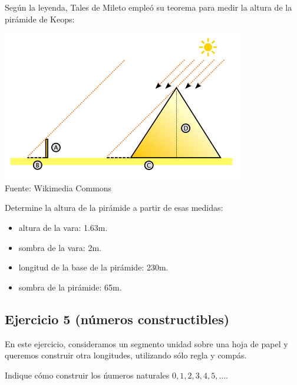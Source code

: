 Según la leyenda, Tales de Mileto empleó su teorema para medir la altura de la
pirámide de Keops:

\begin{center}
\includegraphics{cheops.png}\\
Fuente: Wikimedia Commons
\end{center}

Determine la altura de la pirámide a partir de esas medidas:

\begin{itemize}
  \item altura de la vara: 1.63m.
  \item sombra de la vara: 2m.
  \item longitud de la base de la pirámide: 230m.
  \item sombra de la pirámide: 65m.
\end{itemize}

\subsection{Ejercicio 5 (números constructibles)}

En este ejercicio, consideramos un segmento unidad sobre una hoja de papel y
queremos construir otra longitudes, utilizando sólo regla y compás.

\begin{center}
\end{center}

Indique cómo construir los ńumeros naturales $0, 1, 2, 3, 4, 5, \ldots$.


